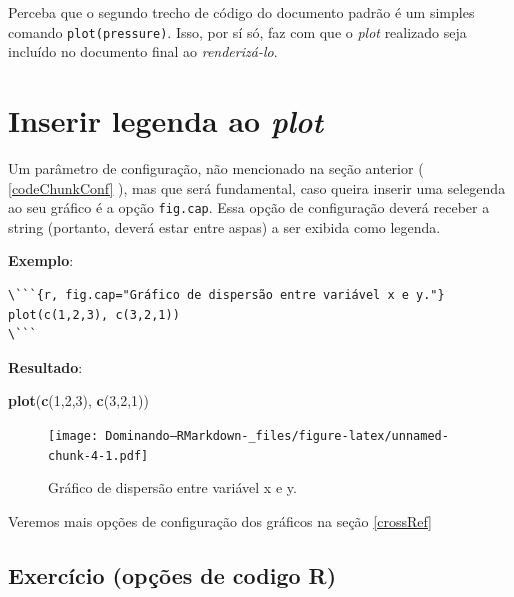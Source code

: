 \documentclass[]{book}
\newenvironment{Shaded}{\begin{snugshade}}{\end{snugshade}}
\newcommand{\DecValTok}[1]{\textcolor[rgb]{0.00,0.00,0.81}{#1}}
\newcommand{\KeywordTok}[1]{\textcolor[rgb]{0.13,0.29,0.53}{\textbf{#1}}}
\newcommand{\NormalTok}[1]{#1}
\begin{document}
Perceba que o segundo trecho de código do documento padrão é um simples comando \texttt{plot(pressure)}. Isso, por sí só, faz com que o \emph{plot} realizado seja incluído no documento final ao \emph{renderizá-lo}.

\hypertarget{InserirLegendaPlot}{%
\section{\texorpdfstring{Inserir legenda ao \emph{plot}}{Inserir legenda ao plot}}\label{InserirLegendaPlot}}

Um parâmetro de configuração, não mencionado na seção anterior ( \ref{codeChunkConf} ), mas que será fundamental, caso queira inserir uma selegenda ao seu gráfico é a opção \texttt{fig.cap}. Essa opção de configuração deverá receber a string (portanto, deverá estar entre aspas) a ser exibida como legenda.

\textbf{Exemplo}:

\begin{verbatim}
\```{r, fig.cap="Gráfico de dispersão entre variável x e y."}
plot(c(1,2,3), c(3,2,1))
\```
\end{verbatim}

\textbf{Resultado}:

\begin{Shaded}
\begin{Highlighting}[]
\KeywordTok{plot}\NormalTok{(}\KeywordTok{c}\NormalTok{(}\DecValTok{1}\NormalTok{,}\DecValTok{2}\NormalTok{,}\DecValTok{3}\NormalTok{), }\KeywordTok{c}\NormalTok{(}\DecValTok{3}\NormalTok{,}\DecValTok{2}\NormalTok{,}\DecValTok{1}\NormalTok{))}
\end{Highlighting}
\end{Shaded}

\begin{figure}
\centering
\texttt{[image: Dominando--RMarkdown-\_files/figure-latex/unnamed-chunk-4-1.pdf]}
\caption{\label{fig:unnamed-chunk-4}Gráfico de dispersão entre variável x e y.}
\end{figure}

Veremos mais opções de configuração dos gráficos na seção \ref{crossRef}

\hypertarget{exercuxedcio-opuxe7uxf5es-de-codigo-r}{%
\subsection{Exercício (opções de codigo R)}\label{exercuxedcio-opuxe7uxf5es-de-codigo-r}}
\end{document}
